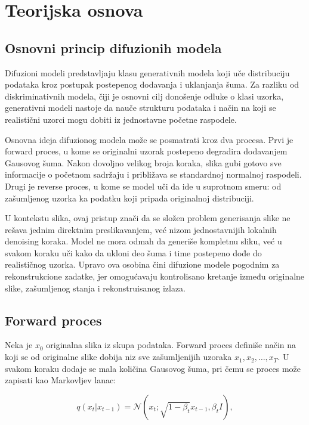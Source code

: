 \documentclass[10pt]{article}
\begin{document}
	\section{Teorijska osnova}
	
	\subsection{Osnovni princip difuzionih modela}
	
	Difuzioni modeli predstavljaju klasu generativnih modela koji uče distribuciju podataka kroz postupak postepenog dodavanja i uklanjanja šuma. Za razliku od diskriminativnih modela, čiji je osnovni cilj donošenje odluke o klasi uzorka, generativni modeli nastoje da nauče strukturu podataka i način na koji se realistični uzorci mogu dobiti iz jednostavne početne raspodele.
	
	Osnovna ideja difuzionog modela može se posmatrati kroz dva procesa. Prvi je forward proces, u kome se originalni uzorak postepeno degradira dodavanjem Gausovog šuma. Nakon dovoljno velikog broja koraka, slika gubi gotovo sve informacije o početnom sadržaju i približava se standardnoj normalnoj raspodeli. Drugi je reverse proces, u kome se model uči da ide u suprotnom smeru: od zašumljenog uzorka ka podatku koji pripada originalnoj distribuciji.
	
	U kontekstu slika, ovaj pristup znači da se složen problem generisanja slike ne rešava jednim direktnim preslikavanjem, već nizom jednostavnijih lokalnih denoising koraka. Model ne mora odmah da generiše kompletnu sliku, već u svakom koraku uči kako da ukloni deo šuma i time postepeno dođe do realističnog uzorka. Upravo ova osobina čini difuzione modele pogodnim za rekonstrukcione zadatke, jer omogućavaju kontrolisano kretanje između originalne slike, zašumljenog stanja i rekonstruisanog izlaza.
	
	\subsection{Forward proces}
	
	Neka je $x_0$ originalna slika iz skupa podataka. Forward proces definiše način na koji se od originalne slike dobija niz sve zašumljenijih uzoraka $x_1, x_2, \ldots, x_T$. U svakom koraku dodaje se mala količina Gausovog šuma, pri čemu se proces može zapisati kao Markovljev lanac:
	
	\begin{equation}
		q(x_t|x_{t-1}) =
		\mathcal{N}(x_t; \sqrt{1-\beta_t}x_{t-1}, \beta_t I),
	\end{equation}
	
\end{document}
